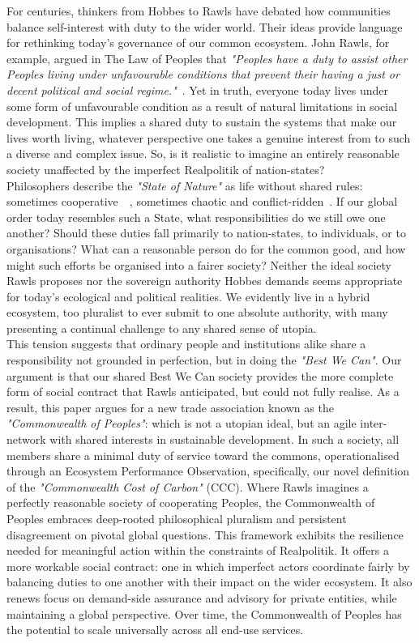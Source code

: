 \documentclass[12pt, oneside]{article}   	%
\begin{document}
For centuries, thinkers from Hobbes to Rawls have debated how communities balance self-interest with duty to the wider world.
Their ideas provide language for rethinking today’s governance of our common ecosystem.
John Rawls, for example, argued in The Law of Peoples that \emph{"Peoples have a duty to assist other Peoples living under unfavourable conditions that prevent their having a just or decent political and social regime."}~\cite{jr2}.
Yet in truth, everyone today lives under some form of unfavourable condition as a result of natural limitations in social development.
This implies a shared duty to sustain the systems that make our lives worth living, whatever perspective one takes a genuine interest from to such a diverse and complex issue.
So, is it realistic to imagine an entirely reasonable society unaffected by the imperfect Realpolitik of nation-states?\\

Philosophers describe the \emph{"State of Nature"} as life without shared rules: sometimes cooperative~\cite{jl1}~\cite{rn1}, sometimes chaotic and conflict-ridden~\cite{th1}.
If our global order today resembles such a State, what responsibilities do we still owe one another?
Should these duties fall primarily to nation-states, to individuals, or to organisations?
What can a reasonable person do for the common good, and how might such efforts be organised into a fairer society?
Neither the ideal society Rawls proposes nor the sovereign authority Hobbes demands seems appropriate for today’s ecological and political realities.
We evidently live in a hybrid ecosystem, too pluralist to ever submit to one absolute authority, with many presenting a continual challenge to any shared sense of utopia.\\

This tension suggests that ordinary people and institutions alike share a responsibility not grounded in perfection, but in doing the \emph{"Best We Can"}.
Our argument is that our shared Best We Can society provides the more complete form of social contract that Rawls anticipated, but could not fully realise.
As a result, this paper argues for a new trade association known as the \emph{"Commonwealth of Peoples"}: which is not a utopian ideal, but an agile inter-network with shared interests in sustainable development.
In such a society, all members share a minimal duty of service toward the commons, operationalised through an Ecosystem Performance Observation, specifically, our novel definition of the \emph{"Commonwealth Cost of Carbon"} (CCC).
Where Rawls imagines a perfectly reasonable society of cooperating Peoples, the Commonwealth of Peoples embraces deep-rooted philosophical pluralism and persistent disagreement on pivotal global questions.
This framework exhibits the resilience needed for meaningful action within the constraints of Realpolitik.
It offers a more workable social contract: one in which imperfect actors coordinate fairly by balancing duties to one another with their impact on the wider ecosystem.
It also renews focus on demand-side assurance and advisory for private entities, while maintaining a global perspective.
Over time, the Commonwealth of Peoples has the potential to scale universally across all end-use services.\\
\end{document}
